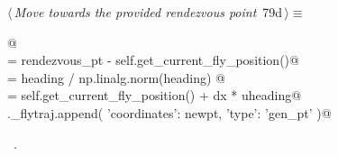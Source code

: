 \documentclass[11.5pt]{report}
\begin{document}
\vspace{-0.8cm} \newchunk {}
\begin{flushleft} \small
\begin{minipage}{\linewidth}\label{scrap122}\raggedright\small
{} $\langle\,${\itshape Move towards the provided rendezvous point}\nobreak\ {\footnotesize {79d}}$\,\rangle\equiv$
\vspace{-1ex}
\begin{list}{}{} \item
\mbox{}\verb@   @\\
\mbox{}\verb@heading  = rendezvous_pt - self.get_current_fly_position()@\\
\mbox{}\verb@uheading = heading / np.linalg.norm(heading) @\\
\mbox{}\verb@newpt    = self.get_current_fly_position() + dx * uheading@\\
\mbox{}\verb@self._flytraj.append(  {'coordinates': newpt, 'type': 'gen_pt'}  )@\\
\mbox{}\verb@@{\NWsep}
\end{list}
\vspace{-1.5ex}
\footnotesize
\begin{list}{}{\setlength{\itemsep}{-\parsep}\setlength{\itemindent}{-\leftmargin}}
\item \NWtxtMacroRefIn\ .

\item{}
\end{list}
\end{minipage}\vspace{4ex}
\end{flushleft}
\end{document}
